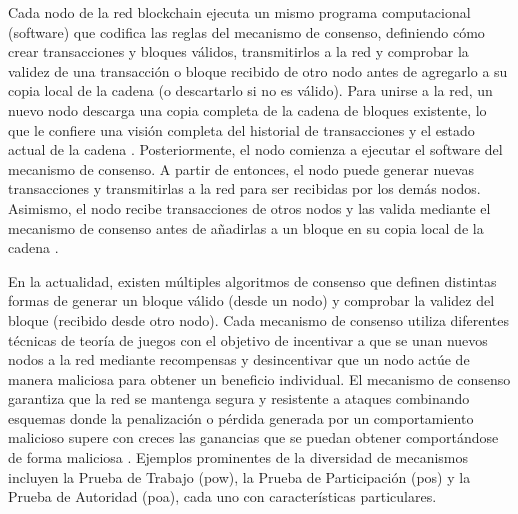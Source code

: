 Cada nodo de la red blockchain ejecuta un mismo programa computacional (software) que codifica las reglas del mecanismo de consenso, definiendo cómo crear transacciones y bloques válidos, transmitirlos a la red y comprobar la validez de una transacción o bloque recibido de otro nodo antes de agregarlo a su copia local de la cadena (o descartarlo si no es válido). Para unirse a la red, un nuevo nodo descarga una copia completa de la cadena de bloques existente, lo que le confiere una visión completa del historial de transacciones y el estado actual de la cadena \cite{bulkowska2023implementation}. Posteriormente, el nodo comienza a ejecutar el software del mecanismo de consenso. A partir de entonces, el nodo puede generar nuevas transacciones y transmitirlas a la red para ser recibidas por los demás nodos. Asimismo, el nodo recibe transacciones de otros nodos y las valida mediante el mecanismo de consenso antes de añadirlas a un bloque en su copia local de la cadena \cite{bulkowska2023implementation}.

En la actualidad, existen múltiples algoritmos de consenso que definen distintas formas de generar un bloque válido (desde un nodo) y comprobar la validez del bloque (recibido desde otro nodo). Cada mecanismo de consenso utiliza diferentes técnicas de teoría de juegos con el objetivo de incentivar a que se unan nuevos nodos a la red mediante recompensas y desincentivar que un nodo actúe de manera maliciosa para obtener un beneficio individual. El mecanismo de consenso garantiza que la red se mantenga segura y resistente a ataques combinando esquemas donde la penalización o pérdida generada por un comportamiento malicioso supere con creces las ganancias que se puedan obtener comportándose de forma maliciosa \cite{satoshi2008bitcoin}. Ejemplos prominentes de la diversidad de mecanismos incluyen la Prueba de Trabajo (\acrshort{pow}), la Prueba de Participación (\acrshort{pos}) y la Prueba de Autoridad (\acrshort{poa}), cada uno con características particulares.

